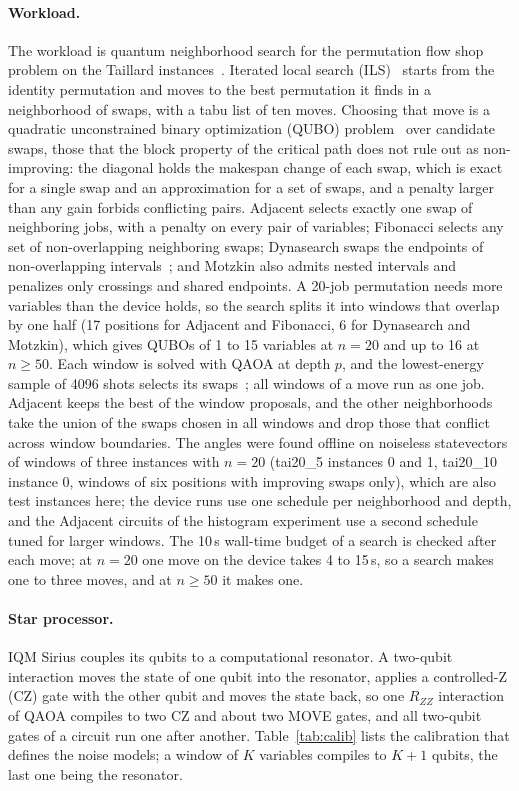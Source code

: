 \documentclass{scspaperproc}
\begin{document}
\paragraph{Workload.}
The workload is quantum neighborhood search for the permutation flow shop
problem on the Taillard instances~\cite{taillard1993}. Iterated local search
(ILS)~\cite{lourenco2003} starts from the identity permutation and moves to the
best permutation it finds in a neighborhood of swaps, with a tabu list of ten
moves. Choosing that move is a quadratic unconstrained binary
optimization (QUBO) problem~\cite{lucas2014ising} over candidate swaps, those
that the block property of the critical path does not rule out as
non-improving: the
diagonal holds the makespan change of each swap, which is exact for a single
swap and an approximation for a set of swaps, and a penalty larger than any
gain forbids conflicting pairs. Adjacent selects exactly one swap of neighboring jobs, with a penalty on every
pair of variables;
Fibonacci selects any set of non-overlapping neighboring swaps; Dynasearch
swaps the endpoints of non-overlapping intervals~\cite{congram2002dynasearch};
and Motzkin also admits nested intervals and penalizes only crossings and
shared endpoints. A 20-job permutation needs more variables than the device
holds, so the search splits it into windows that overlap by one half (17
positions for Adjacent and Fibonacci, 6 for Dynasearch and Motzkin), which
gives QUBOs of 1 to 15 variables at $n = 20$ and up to 16 at $n \ge 50$. Each
window is solved with QAOA at depth $p$, and the lowest-energy sample of 4096
shots selects its swaps~\cite{anon2026b,anon2026c}; all windows of a move run
as one job. Adjacent keeps the best of the window proposals, and the other
neighborhoods take the union of the swaps chosen in all windows and drop
those that conflict across window boundaries. The angles were found offline
on noiseless statevectors of windows of three instances with $n = 20$ (tai20\_5
instances 0 and 1, tai20\_10 instance 0, windows of six positions with
improving swaps only), which are also test instances here;
the device runs use one schedule per neighborhood and depth, and the Adjacent
circuits of the histogram experiment use a second schedule tuned for larger
windows. The 10\,s wall-time budget of a search is checked after each move;
at $n = 20$ one move on the device takes 4 to 15\,s, so a search makes one to
three moves, and at $n \ge 50$ it makes one.

\paragraph{Star processor.}
IQM Sirius couples its qubits to a computational resonator. A two-qubit
interaction moves the state of one qubit into the resonator, applies a
controlled-Z (CZ) gate with the other qubit and moves the state back, so one $R_{ZZ}$ interaction of
QAOA compiles to two CZ and about two MOVE gates, and all two-qubit gates of a
circuit run one after another. Table~\ref{tab:calib} lists the calibration
that defines the noise models; a window of $K$ variables compiles to $K + 1$
qubits, the last one being the resonator.
\end{document}
